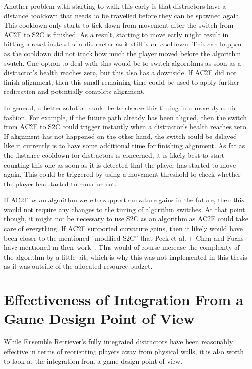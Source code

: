Another problem with starting to walk this early is that distractors have a distance cooldown that needs to be travelled before they can be spawned again. This cooldown only starts to tick down from movement after the switch from AC2F to S2C is finished. As a result, starting to move early might result in hitting a reset instead of a distractor as it still is on cooldown. This can happen as the cooldown did not track how much the player moved before the algorithm switch. One option to deal with this would be to switch algorithms as soon as a distractor's health reaches zero, but this also has a downside. If AC2F did not finish alignment, then this small remaining time could be used to apply further redirection and potentially complete alignment. 

In general, a better solution could be to choose this timing in a more dynamic fashion. For example, if the future path already has been aligned, then the switch from AC2F to S2C could trigger instantly when a distractor's health reaches zero. If alignment has not happened on the other hand, the switch could be delayed like it currently is to have some additional time for finishing alignment. As far as the distance cooldown for distractors is concerned, it is likely best to start counting this one as soon as it is detected that the player has started to move again. This could be triggered by using a movement threshold to check whether the player has started to move or not.  

If AC2F as an algorithm were to support curvature gains in the future, then this would not require any changes to the timing of algorithm switches. At that point though, it might not be necessary to use S2C as an algorithm as AC2F could take care of everything. If AC2F supported curvature gains, then it likely would have been closer to the mentioned ''modified S2C'' that Peck et al. + Chen and Fuchs have mentioned in their work~\cite{peck2010improved, chen2017towards, chen2017supporting}. This would of course increase the complexity of the algorithm by a little bit, which is why this was not implemented in this thesis as it was outside of the allocated resource budget.

\section{Effectiveness of Integration From a Game Design Point of View}
While Ensemble Retriever's fully integrated distractors have been reasonably effective in terms of reorienting players away from physical walls, it is also worth to look at the integration from a game design point of view. 


